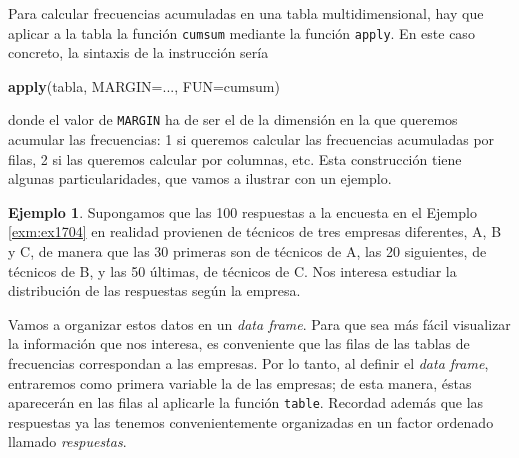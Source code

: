 \documentclass[
]{book}
\newenvironment{Shaded}{\begin{snugshade}}{\end{snugshade}}
\newcommand{\DataTypeTok}[1]{\textcolor[rgb]{0.13,0.29,0.53}{#1}}
\newcommand{\KeywordTok}[1]{\textcolor[rgb]{0.13,0.29,0.53}{\textbf{#1}}}
\newcommand{\NormalTok}[1]{#1}
\theoremstyle{definition}
\theoremstyle{definition}
\newtheorem{example}{Ejemplo}[chapter]
\theoremstyle{definition}
\theoremstyle{remark}
\begin{document}
Para calcular frecuencias acumuladas en una tabla multidimensional, hay que aplicar a la tabla la función \texttt{cumsum} mediante la función \texttt{apply}. En este caso concreto, la sintaxis de la instrucción sería

\begin{Shaded}
\begin{Highlighting}[]
\KeywordTok{apply}\NormalTok{(tabla, }\DataTypeTok{MARGIN=}\NormalTok{..., }\DataTypeTok{FUN=}\NormalTok{cumsum)}
\end{Highlighting}
\end{Shaded}

donde el valor de \texttt{MARGIN} ha de ser el de la dimensión en la que queremos acumular las frecuencias: 1 si queremos calcular las frecuencias acumuladas por filas, 2 si las queremos calcular por columnas, etc. Esta construcción tiene algunas particularidades, que vamos a ilustrar con un ejemplo.

\begin{example}
\protect\hypertarget{exm:encuestacum}{}{\label{exm:encuestacum} }Supongamos que las 100 respuestas a la encuesta en el Ejemplo \ref{exm:ex1704} en realidad provienen de técnicos de tres empresas diferentes, A, B y C, de manera que las 30 primeras son de técnicos de A, las 20 siguientes, de técnicos de B, y las 50 últimas, de técnicos de C. Nos interesa estudiar la distribución de las respuestas según la empresa.
\end{example}

Vamos a organizar estos datos en un \emph{data frame}. Para que sea más fácil visualizar la información que nos interesa, es conveniente que las filas de las tablas de frecuencias correspondan a las empresas. Por lo tanto, al definir el \emph{data frame}, entraremos como primera variable la de las empresas; de esta manera, éstas aparecerán en las filas al aplicarle la función \texttt{table}. Recordad además que las respuestas ya las tenemos convenientemente organizadas en un factor ordenado llamado \emph{respuestas}.
\end{document}
